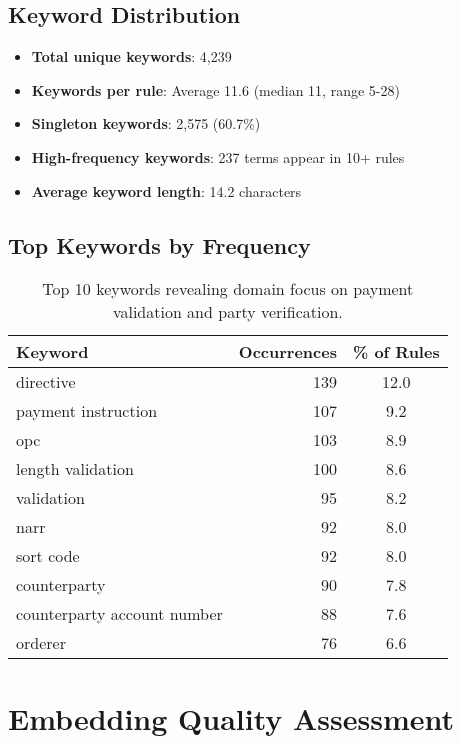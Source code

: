 \subsection{Keyword Distribution}

\begin{itemize}[leftmargin=*,itemsep=2pt,topsep=2pt]
 \item \textbf{Total unique keywords}: 4,239
 \item \textbf{Keywords per rule}: Average 11.6 (median 11, range 5-28)
 \item \textbf{Singleton keywords}: 2,575 (60.7\%)
 \item \textbf{High-frequency keywords}: 237 terms appear in 10+ rules
 \item \textbf{Average keyword length}: 14.2 characters
\end{itemize}

\subsection{Top Keywords by Frequency}

\begin{table}[ht]
\centering
\begin{tabular}{lrc}
\toprule
\textbf{Keyword} & \textbf{Occurrences} & \textbf{\% of Rules} \\
\midrule
directive & 139 & 12.0 \\
payment instruction & 107 & 9.2 \\
opc & 103 & 8.9 \\
length validation & 100 & 8.6 \\
validation & 95 & 8.2 \\
narr & 92 & 8.0 \\
sort code & 92 & 8.0 \\
counterparty & 90 & 7.8 \\
counterparty account number & 88 & 7.6 \\
orderer & 76 & 6.6 \\
\bottomrule
\end{tabular}
\caption{Top 10 keywords revealing domain focus on payment validation and party verification.}
\label{tab:top-keywords}
\end{table}

\section{Embedding Quality Assessment}

